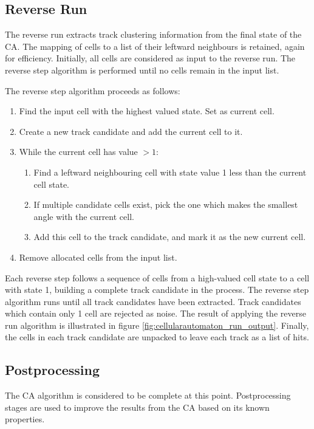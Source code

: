 \subsection{Reverse Run}\label{sec:cellularautomaton_reverse_run}
The reverse run extracts track clustering information from the final state of the \ac{CA}. The mapping of cells to a list of their leftward neighbours is retained, again for efficiency. Initially, all cells are considered as input to the reverse run. The reverse step algorithm is performed until no cells remain in the input list.

The reverse step algorithm proceeds as follows:
\begin{enumerate}
	\item Find the input cell with the highest valued state. Set as current cell.
	\item Create a new track candidate and add the current cell to it.
	\item While the current cell has value $> 1$:
	\begin{enumerate}
		\item Find a leftward neighbouring cell with state value 1 less than the current cell state.
		\item If multiple candidate cells exist, pick the one which makes the smallest angle with the current cell.
		\item Add this cell to the track candidate, and mark it as the new current cell.
	\end{enumerate}
	\item Remove allocated cells from the input list.
\end{enumerate}

Each reverse step follows a sequence of cells from a high-valued cell state to a cell with state 1, building a complete track candidate in the process. The reverse step algorithm runs until all track candidates have been extracted. Track candidates which contain only 1 cell are rejected as noise. The result of applying the reverse run algorithm is illustrated in figure \ref{fig:cellularautomaton_run_output}. Finally, the cells in each track candidate are unpacked to leave each track as a list of hits.

\subsection{Postprocessing}\label{sec:cellularautomaton_postprocessing}
The \ac{CA} algorithm is considered to be complete at this point. Postprocessing stages are used to improve the results from the \ac{CA} based on its known properties.

